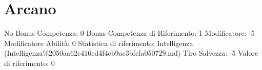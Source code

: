 \section{Arcano}\label{arcano}

\begin{description}
\tightlist
\item[Tags: ABI]
No Bonus Competenza: 0 Bonus Competenza di Riferimento: 1 Modificatore:
-5 Modificatore Abilità: 0 Statistica di riferimento: Intelligenza
(Intelligenza\%2050aa62c416cd4f4eb9ac3bfcfa050729.md) Tiro Salvezza: -5
Valore di riferimento: 0
\end{description}
